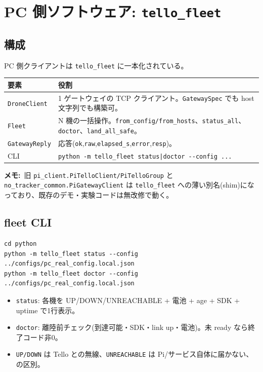 \documentclass[11pt,a4paper]{ltjsarticle}
\newcommand{\code}[1]{\texttt{\small #1}}
\newcommand{\note}[1]{\par\smallskip\noindent\textbf{メモ:}~#1\par\smallskip}
\begin{document}
\section{PC 側ソフトウェア: \code{tello\_fleet}}

\subsection{構成}
PC 側クライアントは \code{tello\_fleet} に一本化されている。

\begin{longtable}{@{}p{3.8cm}p{11.2cm}@{}}
\toprule
\textbf{要素} & \textbf{役割} \\
\midrule
\endhead
\code{DroneClient} & 1 ゲートウェイの TCP クライアント。\code{GatewaySpec} でも host 文字列でも構築可。\\
\code{Fleet} & N 機の一括操作。\code{from\_config/from\_hosts}、\code{status\_all}、\code{doctor}、\code{land\_all\_safe}。\\
\code{GatewayReply} & 応答(\code{ok},\code{raw},\code{elapsed\_s},\code{error},\code{resp})。\\
CLI & \code{python -m tello\_fleet status|doctor -{}-config ...}\\
\bottomrule
\end{longtable}

\note{旧 \code{pi\_client.PiTelloClient/PiTelloGroup} と \code{no\_tracker\_common.PiGatewayClient}
は \code{tello\_fleet} への薄い別名(shim)になっており、既存のデモ・実験コードは無改修で動く。}

\subsection{fleet CLI}
\begin{lstlisting}
cd python
python -m tello_fleet status --config ../configs/pc_real_config.local.json
python -m tello_fleet doctor --config ../configs/pc_real_config.local.json
\end{lstlisting}
\begin{itemize}[leftmargin=1.4em]
  \item \code{status}: 各機を UP/DOWN/UNREACHABLE + 電池 + age + SDK + uptime で1行表示。
  \item \code{doctor}: 離陸前チェック(到達可能・SDK・link up・電池)。未 ready なら終了コード非0。
  \item \code{UP/DOWN} は Tello との無線、\code{UNREACHABLE} は Pi/サービス自体に届かない、の区別。
\end{itemize}
\end{document}
